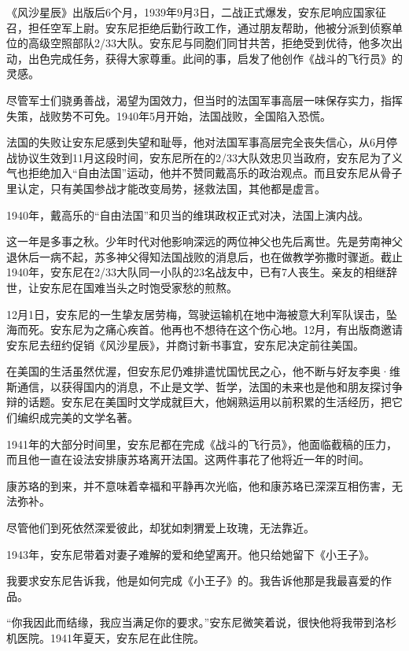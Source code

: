 《风沙星辰》出版后6个月，1939年9月3日，二战正式爆发，安东尼响应国家征召，担任空军上尉。安东尼拒绝后勤行政工作，通过朋友帮助，他被分派到侦察单位的高级空照部队2/33大队。安东尼与同胞们同甘共苦，拒绝受到优待，他多次出动，出色完成任务，获得大家尊重。此间的事，启发了他创作《战斗的飞行员》的灵感。

尽管军士们骁勇善战，渴望为国效力，但当时的法国军事高层一味保存实力，指挥失策，战败势不可免。1940年5月开始，法国战败，全国陷入恐慌。

法国的失败让安东尼感到失望和耻辱，他对法国军事高层完全丧失信心，从6月停战协议生效到11月这段时间，安东尼所在的2/33大队效忠贝当政府，安东尼为了义气也拒绝加入“自由法国”运动，他并不赞同戴高乐的政治观点。而且安东尼从骨子里认定，只有美国参战才能改变局势，拯救法国，其他都是虚言。

1940年，戴高乐的“自由法国”和贝当的维琪政权正式对决，法国上演内战。

这一年是多事之秋。少年时代对他影响深远的两位神父也先后离世。先是劳南神父退休后一病不起，苏多神父得知法国战败的消息后，也在做教学弥撒时骤逝。截止1940年，安东尼在2/33大队同一小队的23名战友中，已有7人丧生。亲友的相继辞世，让安东尼在国难当头之时饱受家愁的煎熬。

12月1日，安东尼的一生挚友居劳梅，驾驶运输机在地中海被意大利军队误击，坠海而死。安东尼为之痛心疾首。他再也不想待在这个伤心地。12月，有出版商邀请安东尼去纽约促销《风沙星辰》，并商讨新书事宜，安东尼决定前往美国。

在美国的生活虽然优渥，但安东尼仍难排遣忧国忧民之心，他不断与好友李奥·维斯通信，以获得国内的消息，不止是文学、哲学，法国的未来也是他和朋友探讨争辩的话题。安东尼在美国时文学成就巨大，他娴熟运用以前积累的生活经历，把它们编织成完美的文学名著。

1941年的大部分时间里，安东尼都在完成《战斗的飞行员》，他面临截稿的压力，而且他一直在设法安排康苏珞离开法国。这两件事花了他将近一年的时间。

康苏珞的到来，并不意味着幸福和平静再次光临，他和康苏珞已深深互相伤害，无法弥补。

尽管他们到死依然深爱彼此，却犹如刺猬爱上玫瑰，无法靠近。

1943年，安东尼带着对妻子难解的爱和绝望离开。他只给她留下《小王子》。


\stoptitle

\starttitle[title={13}]

我要求安东尼告诉我，他是如何完成《小王子》的。我告诉他那是我最喜爱的作品。

“你我因此而结缘，我应当满足你的要求。”安东尼微笑着说，很快他将我带到洛杉机医院。1941年夏天，安东尼在此住院。

